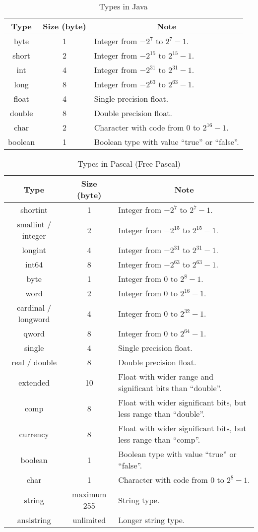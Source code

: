 \documentclass{article}
\begin{document}
\begin{table}[hp]
\centering
\begin{tabular}{ccl}
\toprule
Type & Size (byte) & \multicolumn{1}{c}{Note} \\
\midrule
byte & 1 & Integer from $-2^7$ to $2^7-1$. \\
short & 2 & Integer from $-2^{15}$ to $2^{15}-1$. \\
int & 4 & Integer from $-2^{31}$ to $2^{31}-1$. \\
long & 8 & Integer from $-2^{63}$ to $2^{63}-1$. \\
float & 4 & Single precision float. \\
double & 8 & Double precision float. \\
char & 2 & Character with code from $0$ to $2^{16}-1$. \\
boolean & 1 & Boolean type with value ``true'' or ``false''. \\
\bottomrule
\end{tabular}
\caption{Types in Java}
\label{t:javatype}
\end{table}

\begin{table}[hp]
\centering
\begin{tabular}{ccl}
\toprule
Type & Size (byte) & \multicolumn{1}{c}{Note} \\
\midrule
shortint & 1 & Integer from $-2^7$ to $2^7-1$. \\
smallint / integer & 2 & Integer from $-2^{15}$ to $2^{15}-1$. \\
longint & 4 & Integer from $-2^{31}$ to $2^{31}-1$. \\
int64 & 8 & Integer from $-2^{63}$ to $2^{63}-1$. \\
byte & 1 & Integer from $0$ to $2^8-1$. \\
word & 2 & Integer from $0$ to $2^{16}-1$. \\
cardinal / longword & 4 & Integer from $0$ to $2^{32}-1$. \\
qword & 8 & Integer from $0$ to $2^{64}-1$. \\
single & 4 & Single precision float. \\
real / double & 8 & Double precision float. \\
extended & 10 & Float with wider range and significant bits than ``double''. \\
comp & 8 & Float with wider significant bits, but less range than ``double''. \\
currency & 8 & Float with wider significant bits, but less range than ``comp''. \\
boolean & 1 & Boolean type with value ``true'' or ``false''. \\
char & 1 & Character with code from $0$ to $2^8-1$. \\
string & maximum 255 & String type. \\
ansistring & unlimited & Longer string type. \\
\bottomrule
\end{tabular}
\caption{Types in Pascal (Free Pascal)}
\label{t:pascaltype}
\end{table}
\end{document}
